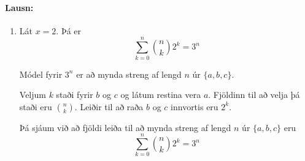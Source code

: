 \documentclass[a4paper,notitlepage]{article}
\theoremstyle{plain}
\theoremstyle{definition}
\begin{document}
\paragraph{Lausn:}
\begin{enumerate}
    \item Lát $x=2$. Þá er
        \begin{equation*}
            \sum_{k=0}^n \binom{n}{k}2^k = 3^n
        \end{equation*}

        Módel fyrir $3^n$ er að mynda streng af lengd $n$ úr $\{a,b,c\}$. 

        Veljum $k$ staði fyrir $b$ og $c$ og látum restina vera $a$. Fjöldinn til að velja þá staði eru $\binom{n}{k}$. Leiðir til að raða $b$ og $c$ innvortis eru $2^k$.

        Þá sjáum við að fjöldi leiða til að mynda streng af lengd $n$ úr $\{a,b,c\}$ eru
        \begin{equation*}
            \sum_{k=0}^n \binom{n}{k}2^k = 3^n
        \end{equation*}

\end{enumerate}
\end{document}
